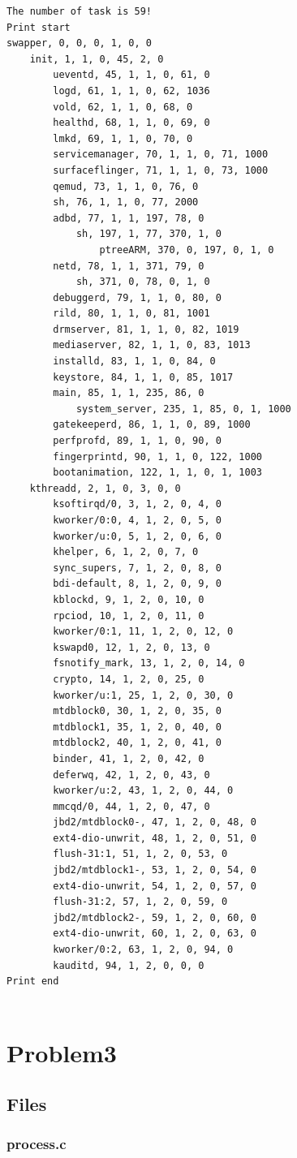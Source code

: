 \documentclass[a4paper,oneside,12pt]{article}
\begin{document}
\begin{lstlisting}
The number of task is 59!
Print start
swapper, 0, 0, 0, 1, 0, 0
	init, 1, 1, 0, 45, 2, 0
		ueventd, 45, 1, 1, 0, 61, 0
		logd, 61, 1, 1, 0, 62, 1036
		vold, 62, 1, 1, 0, 68, 0
		healthd, 68, 1, 1, 0, 69, 0
		lmkd, 69, 1, 1, 0, 70, 0
		servicemanager, 70, 1, 1, 0, 71, 1000
		surfaceflinger, 71, 1, 1, 0, 73, 1000
		qemud, 73, 1, 1, 0, 76, 0
		sh, 76, 1, 1, 0, 77, 2000
		adbd, 77, 1, 1, 197, 78, 0
			sh, 197, 1, 77, 370, 1, 0
				ptreeARM, 370, 0, 197, 0, 1, 0
		netd, 78, 1, 1, 371, 79, 0
			sh, 371, 0, 78, 0, 1, 0
		debuggerd, 79, 1, 1, 0, 80, 0
		rild, 80, 1, 1, 0, 81, 1001
		drmserver, 81, 1, 1, 0, 82, 1019
		mediaserver, 82, 1, 1, 0, 83, 1013
		installd, 83, 1, 1, 0, 84, 0
		keystore, 84, 1, 1, 0, 85, 1017
		main, 85, 1, 1, 235, 86, 0
			system_server, 235, 1, 85, 0, 1, 1000
		gatekeeperd, 86, 1, 1, 0, 89, 1000
		perfprofd, 89, 1, 1, 0, 90, 0
		fingerprintd, 90, 1, 1, 0, 122, 1000
		bootanimation, 122, 1, 1, 0, 1, 1003
	kthreadd, 2, 1, 0, 3, 0, 0
		ksoftirqd/0, 3, 1, 2, 0, 4, 0
		kworker/0:0, 4, 1, 2, 0, 5, 0
		kworker/u:0, 5, 1, 2, 0, 6, 0
		khelper, 6, 1, 2, 0, 7, 0
		sync_supers, 7, 1, 2, 0, 8, 0
		bdi-default, 8, 1, 2, 0, 9, 0
		kblockd, 9, 1, 2, 0, 10, 0
		rpciod, 10, 1, 2, 0, 11, 0
		kworker/0:1, 11, 1, 2, 0, 12, 0
		kswapd0, 12, 1, 2, 0, 13, 0
		fsnotify_mark, 13, 1, 2, 0, 14, 0
		crypto, 14, 1, 2, 0, 25, 0
		kworker/u:1, 25, 1, 2, 0, 30, 0
		mtdblock0, 30, 1, 2, 0, 35, 0
		mtdblock1, 35, 1, 2, 0, 40, 0
		mtdblock2, 40, 1, 2, 0, 41, 0
		binder, 41, 1, 2, 0, 42, 0
		deferwq, 42, 1, 2, 0, 43, 0
		kworker/u:2, 43, 1, 2, 0, 44, 0
		mmcqd/0, 44, 1, 2, 0, 47, 0
		jbd2/mtdblock0-, 47, 1, 2, 0, 48, 0
		ext4-dio-unwrit, 48, 1, 2, 0, 51, 0
		flush-31:1, 51, 1, 2, 0, 53, 0
		jbd2/mtdblock1-, 53, 1, 2, 0, 54, 0
		ext4-dio-unwrit, 54, 1, 2, 0, 57, 0
		flush-31:2, 57, 1, 2, 0, 59, 0
		jbd2/mtdblock2-, 59, 1, 2, 0, 60, 0
		ext4-dio-unwrit, 60, 1, 2, 0, 63, 0
		kworker/0:2, 63, 1, 2, 0, 94, 0
		kauditd, 94, 1, 2, 0, 0, 0
Print end


\end{lstlisting}

\section{Problem3}
\subsection{Files}
\subsubsection{process.c}
\end{document}
